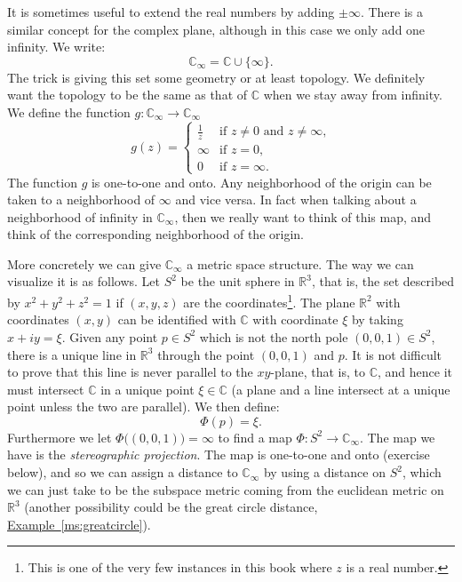 \documentclass[12pt,openany]{book}
\newcommand{\C}{{\mathbb{C}}}
\newcommand{\R}{{\mathbb{R}}}
\theoremstyle{plain}
\theoremstyle{remark}
\theoremstyle{definition}
\theoremstyle{exercise}
\theoremstyle{example}
\newcommand{\exampleref}[1]{\hyperref[#1]{Example~\ref*{#1}}}
\begin{document}
It is sometimes useful to extend the real numbers by adding $\pm \infty$.
There is a similar concept for the complex plane, although in this case
we only add one infinity.  We write:
\begin{equation*}
\C_{\infty} = \C \cup \{ \infty \} .
\end{equation*}
The trick is giving this set some geometry or at least topology.  We
definitely want the topology to be the same as that of $\C$ when we stay
away from infinity.  We define the function $g \colon \C_\infty \to \C_\infty$
\begin{equation*}
g(z) =
\begin{cases}
\frac{1}{z} & \text{if $z \not= 0$ and $z \not= \infty$,} \\
\infty & \text{if $z = 0$,} \\
0 & \text{if $z = \infty$.}
\end{cases}
\end{equation*}
The function $g$ is one-to-one and onto.
Any neighborhood of the origin can be taken to a neighborhood of
$\infty$ and vice versa.  In fact when talking about a neighborhood of
infinity in $\C_{\infty}$, then we really want to think of this map,
and think of the corresponding neighborhood of the origin.

More concretely we can give $\C_{\infty}$ a metric space structure.  The way
we can visualize it is as follows.  Let $S^2$ be the unit sphere in $\R^3$,
that is, the set described by $x^2 + y^2 + z^2 = 1$ if $(x,y,z)$ are the
coordinates\footnote{This is one of the very few instances in this book where
$z$ is a real number.}.  The plane $\R^2$ with coordinates $(x,y)$ can be
identified with $\C$ with coordinate $\xi$ by taking $x+iy = \xi$.
Given any point $p \in S^2$ which is not the north pole $(0,0,1) \in S^2$,
there is a unique line in $\R^3$ through the point $(0,0,1)$ and $p$.
It is not difficult to prove that this line is never parallel to the
$xy$-plane, that is, to $\C$, and hence it must intersect $\C$ in a unique
point $\xi \in \C$ (a plane and a line intersect at a unique point unless
the two are parallel).  We then define:
\begin{equation*}
\Phi(p) = \xi.
\end{equation*}
Furthermore we let $\Phi\bigl((0,0,1)\bigr) = \infty$ to find a map
$\Phi \colon S^2 \to \C_\infty$.  The map we have is the
\emph{stereographic projection}.  The map is one-to-one and onto (exercise
below), and so we can assign a distance to $\C_\infty$ by
using a distance on $S^2$, which we can just take to be the subspace
metric coming from the euclidean metric on $\R^3$ (another possibility
could be the great circle distance, \exampleref{ms:greatcircle}).
\end{document}
